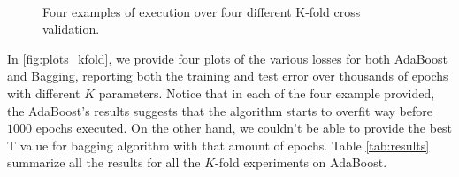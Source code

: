 \begin{figure}
	\centering
	\\
	\caption{\label{fig:plots_kfold}Four examples of execution over four different K-fold cross validation.}
\end{figure}
In \autoref{fig:plots_kfold}, we provide four plots of the various losses for both AdaBoost and Bagging, reporting both the training and test error over thousands of epochs with different $K$ parameters. Notice that in each of the four example provided, the AdaBoost's results suggests that the algorithm starts to overfit way before $1000$ epochs executed. On the other hand, we couldn't be able to provide the best T value for bagging algorithm with that amount of epochs.
Table \autoref{tab:results} summarize all the results for all the $K$-fold experiments on AdaBoost.

